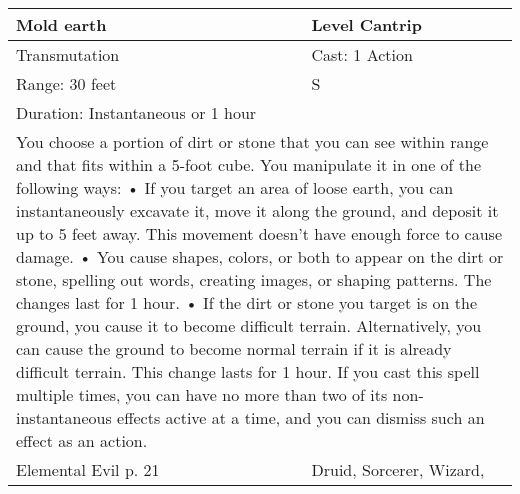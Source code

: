 \documentclass[11pt]{report}
\begin{document}
\begin{table}[H]
	\begin{tabular}{||p{6cm}|p{6cm}||}
		\hline\hline
		\bf{Mold earth} & Level Cantrip\\ \hline
		Transmutation & Cast: 1 Action\\ \hline
		Range: 30 feet & S\\ \hline
		Duration: Instantaneous or 1 hour & \\ \hline
		\multicolumn{2}{||p{12cm}||}{You choose a portion of dirt or stone that you can see within range and that fits within a 5-foot cube. You manipulate it in one of the following ways:
• If you target an area of loose earth, you can instantaneously excavate it, move it along the ground, and deposit it up to 5 feet away. This movement doesn’t have enough force to cause damage.
• You cause shapes, colors, or both to appear on the dirt or stone, spelling out words, creating images, or shaping patterns. The changes last for 1 hour.
• If the dirt or stone you target is on the ground, you cause it to become difficult terrain. Alternatively, you can cause the ground to become normal terrain if it is already difficult terrain. This change lasts for 1 hour. If you cast this spell multiple times, you can have no more than two of its non-instantaneous effects active at a time, and you can dismiss such an effect as an action.}\\ \hline
Elemental Evil p. 21 & Druid, Sorcerer, Wizard, \\ \hline\hline
	\end{tabular}
\end{table}
\end{document}
